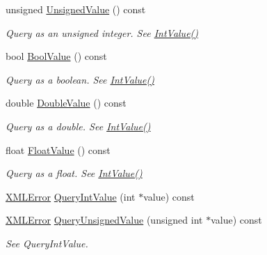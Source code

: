 \begin{DoxyCompactItemize}
\item 
unsigned \mbox{\hyperlink{classtinyxml2_1_1_x_m_l_attribute_a0be5343b08a957c42c02c5d32c35d338}{Unsigned\+Value}} () const
\begin{DoxyCompactList}\small\item\em Query as an unsigned integer. See \mbox{\hyperlink{classtinyxml2_1_1_x_m_l_attribute_adfa2433f0fdafd5c3880936de9affa80}{Int\+Value()}} \end{DoxyCompactList}\item 
bool \mbox{\hyperlink{classtinyxml2_1_1_x_m_l_attribute_a98ce5207344ad33a265b0422addae1ff}{Bool\+Value}} () const
\begin{DoxyCompactList}\small\item\em Query as a boolean. See \mbox{\hyperlink{classtinyxml2_1_1_x_m_l_attribute_adfa2433f0fdafd5c3880936de9affa80}{Int\+Value()}} \end{DoxyCompactList}\item 
double \mbox{\hyperlink{classtinyxml2_1_1_x_m_l_attribute_a4aa73513f54ff0087d3e804f0f54e30f}{Double\+Value}} () const
\begin{DoxyCompactList}\small\item\em Query as a double. See \mbox{\hyperlink{classtinyxml2_1_1_x_m_l_attribute_adfa2433f0fdafd5c3880936de9affa80}{Int\+Value()}} \end{DoxyCompactList}\item 
float \mbox{\hyperlink{classtinyxml2_1_1_x_m_l_attribute_a27797b45d21c981257720db94f5f8801}{Float\+Value}} () const
\begin{DoxyCompactList}\small\item\em Query as a float. See \mbox{\hyperlink{classtinyxml2_1_1_x_m_l_attribute_adfa2433f0fdafd5c3880936de9affa80}{Int\+Value()}} \end{DoxyCompactList}\item 
\mbox{\hyperlink{namespacetinyxml2_a1fbf88509c3ac88c09117b1947414e08}{X\+M\+L\+Error}} \mbox{\hyperlink{classtinyxml2_1_1_x_m_l_attribute_a6d5176260db00ea301c01af8457cd993}{Query\+Int\+Value}} (int $\ast$value) const
\item 
\mbox{\hyperlink{namespacetinyxml2_a1fbf88509c3ac88c09117b1947414e08}{X\+M\+L\+Error}} \mbox{\hyperlink{classtinyxml2_1_1_x_m_l_attribute_a48a7f3496f1415832e451bd8d09c9cb9}{Query\+Unsigned\+Value}} (unsigned int $\ast$value) const
\begin{DoxyCompactList}\small\item\em See Query\+Int\+Value. \end{DoxyCompactList}\item 

\end{DoxyCompactItemize}
